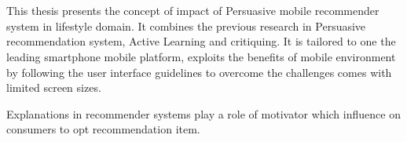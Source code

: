 \chapter{\abstractname}



This thesis presents the concept of impact of Persuasive mobile recommender system in lifestyle domain. It combines the previous research in Persuasive recommendation system, Active Learning and critiquing. It is tailored to one the leading smartphone mobile platform, exploits the benefits of mobile environment by following the user interface guidelines to overcome the challenges comes with limited screen sizes.\newline

Explanations in recommender systems play a role of motivator which influence on consumers to opt recommendation item. 